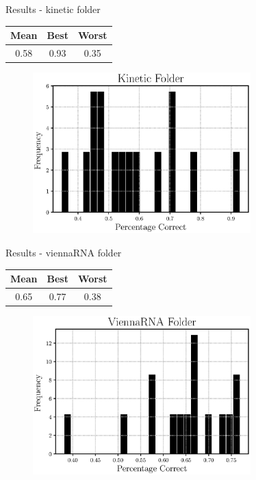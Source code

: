 \documentclass{beamer}
\begin{document}
\begin{frame}{Results - kinetic folder}
\begin{table}
\centering
\begin{tabular}{|ccc|}
\hline
{\bf Mean} & {\bf Best} & {\bf Worst}\\
\hline
\hline
0.58 & 0.93 & 0.35\\
\hline
\end{tabular}
\end{table}
\begin{figure}
\centering
\includegraphics[width =0.75\textwidth]{myfolder_pseudo.eps}
\end{figure}
\end{frame}

\begin{frame}{Results - viennaRNA folder}
\begin{table}
\centering
\begin{tabular}{|ccc|}
\hline
{\bf Mean} & {\bf Best} & {\bf Worst}\\
\hline
\hline
0.65 & 0.77 & 0.38\\
\hline
\end{tabular}
\end{table}
\begin{figure}
\centering
\includegraphics[width =0.75\textwidth]{viennarna_pseudo.eps}
\end{figure}
\end{frame}
\end{document}
